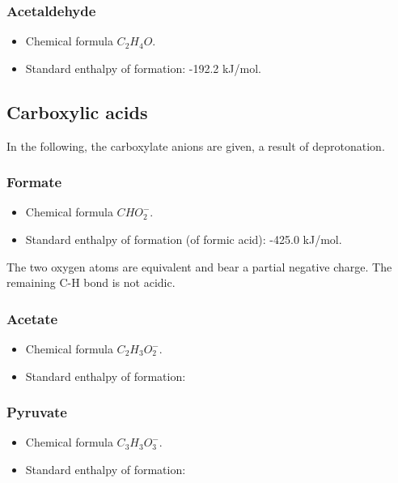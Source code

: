 \documentclass{article}
\begin{document}
\subsubsection{Acetaldehyde}

\begin{itemize}
    \item Chemical formula $C_2H_4O$.
    \item Standard enthalpy of formation: -192.2 kJ/mol.
\end{itemize}

\subsection{Carboxylic acids}

In the following, the carboxylate anions are given, a result of deprotonation.

\subsubsection{Formate}
\begin{itemize}
    \item Chemical formula $CHO_2^-$.
    \item Standard enthalpy of formation (of formic acid): -425.0 kJ/mol.
\end{itemize}
The two oxygen atoms are equivalent and bear a partial negative charge. The remaining C-H
bond is not acidic.

\subsubsection{Acetate}
\begin{itemize}
    \item Chemical formula $C_2H_3O_2^-$.
    \item Standard enthalpy of formation:
\end{itemize}

\subsubsection{Pyruvate}
\begin{itemize}
    \item Chemical formula $C_3H_3O_3^-$.
    \item Standard enthalpy of formation:
\end{itemize}
\end{document}
